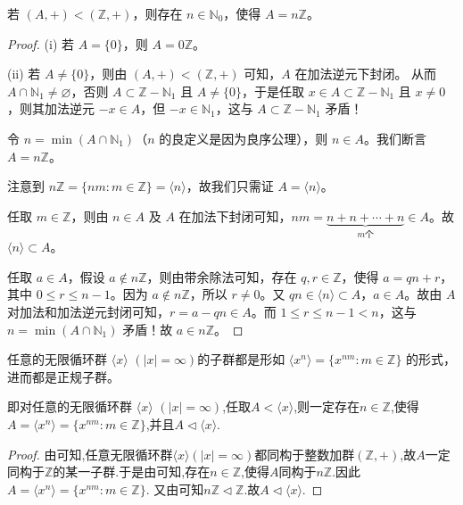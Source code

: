 \documentclass[../../main.tex]{subfiles}
\begin{document}
\begin{proposition}\label{proposition:Z的任意子群都形如nZ}
若 $(A, +)<(\mathbb{Z}, +)$，则存在 $n\in\mathbb{N}_0$，使得 $A = n\mathbb{Z}$。
\end{proposition}
\begin{proof}
(i) 若 $A = \{0\}$，则 $A = 0\mathbb{Z}$。

(ii) 若 $A\neq\{0\}$，则由 $(A, +)<(\mathbb{Z}, +)$ 可知，$A$ 在加法逆元下封闭。
从而 $A\cap\mathbb{N}_1\neq\varnothing$，否则 $A\subset\mathbb{Z}-\mathbb{N}_1$ 且 $A\neq\{0\}$，于是任取 $x\in A\subset\mathbb{Z}-\mathbb{N}_1$ 且 $x\neq 0$，则其加法逆元 $-x\in A$，但 $-x\in\mathbb{N}_1$，这与 $A\subset\mathbb{Z}-\mathbb{N}_1$ 矛盾！

令 $n = \min(A\cap\mathbb{N}_1)$（$n$ 的良定义是因为良序公理），则 $n\in A$。我们断言 $A = n\mathbb{Z}$。

注意到 $n\mathbb{Z}=\{nm:m\in\mathbb{Z}\}=\langle n\rangle$，故我们只需证 $A = \langle n\rangle$。

任取 $m\in\mathbb{Z}$，则由 $n\in A$ 及 $A$ 在加法下封闭可知，$nm=\underset{m\text{个}}{\underbrace{n + n+\cdots + n}}\in A$。故 $\langle n\rangle\subset A$。

任取 $a\in A$，假设 $a\notin n\mathbb{Z}$，则由带余除法可知，存在 $q,r\in\mathbb{Z}$，使得 $a = qn + r$，其中 $0\leqslant r\leqslant n - 1$。因为 $a\notin n\mathbb{Z}$，所以 $r\neq 0$。又 $qn\in\langle n\rangle\subset A$，$a\in A$。故由 $A$ 对加法和加法逆元封闭可知，$r = a - qn\in A$。而 $1\leqslant r\leqslant n - 1 < n$，这与 $n = \min(A\cap\mathbb{N}_1)$ 矛盾！故 $a\in n\mathbb{Z}$。 
\end{proof}

\begin{corollary}
任意的无限循环群 $\langle x\rangle$ $(|x|=\infty)$的子群都是形如 $\langle x^n\rangle=\{x^{nm}:m\in\mathbb{Z}\}$ 的形式，进而都是正规子群。
 
即对任意的无限循环群 $\langle x\rangle$ $(|x|=\infty)$,任取$A<\langle x\rangle$,则一定存在$n\in \mathbb{Z}$,使得$A=\langle x^n\rangle=\{x^{nm}:m\in\mathbb{Z}\}$,并且$A\lhd \langle x\rangle$.
\end{corollary}
\begin{proof}
由可知,任意无限循环群$\langle x\rangle(|x|=\infty)$都同构于整数加群$(\mathbb{Z},+)$,故$A$一定同构于$\mathbb{Z}$的某一子群.于是由可知,存在$n\in \mathbb{Z}$,使得$A$同构于$n \mathbb{Z}$.因此$A=\langle x^n\rangle=\{x^{nm}:m\in\mathbb{Z}\}$.
又由可知$n \mathbb{Z}\lhd \mathbb{Z}$.故$A\lhd \langle x\rangle$.
\end{proof}
\end{document}
